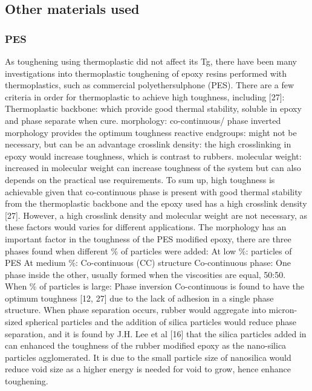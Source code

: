 \documentclass[numbers=noendperiod,chapterprefix=on]{icldt} %
\begin{document}
\subsection{Other materials used}
\subsubsection{PES}
As toughening using thermoplastic did not affect its Tg, there have been many investigations into thermoplastic toughening of epoxy resins performed with thermoplastics, such as commercial polyethersulphone (PES). \newline
There are a few criteria in order for thermoplastic to achieve high toughness, including [27]:
 Thermoplastic backbone: which provide good thermal stability, soluble in epoxy and phase separate when cure.
 morphology: co-continuous/ phase inverted morphology provides the optimum toughness
 reactive endgroups: might not be necessary, but can be an advantage
 crosslink density: the high crosslinking in epoxy would increase toughness, which is contrast to rubbers.
 molecular weight: increased in molecular weight can increase toughness of the system but can also depends on the practical use requirements.
\newline
To sum up, high toughness is achievable given that co-continuous phase is present with good thermal stability from the thermoplastic backbone and the epoxy used has a high crosslink density [27].  However, a high crosslink density and molecular weight are not necessary, as these factors would varies for different applications.
The morphology has an important factor in the toughness of the PES modified epoxy, there are three phases found when different \% of particles were added:\newline
At low \%: particles of PES
\newline
At medium \%: Co-continuous (CC) structure  
\newline
Co-continuous phase: One phase inside the other, usually formed when the viscosities are equal, 50:50. 
\newline
When \% of particles is large: Phase inversion
\newline
Co-continuous is found to have the optimum toughness [12, 27] due to the lack of adhesion in a single phase structure. When phase separation occurs, rubber would aggregate into micron-sized spherical particles and the addition of silica particles would reduce phase separation, and it is found by J.H. Lee et al [16] that the silica particles added in can enhanced the toughness of the rubber modified epoxy as the nano-silica particles agglomerated. It is due to the small particle size of nanosilica would reduce void size as a higher energy is needed for void to grow, hence enhance toughening.
\end{document}
